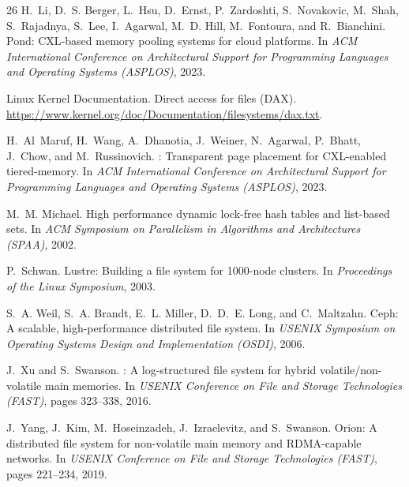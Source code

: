 \documentclass[letterpaper,twocolumn,10pt]{article}
\begin{document}
\begin{thebibliography}{26}
H.~Li, D.~S. Berger, L.~Hsu, D.~Ernst, P.~Zardoshti, S.~Novakovic,
  M.~Shah, S.~Rajadnya, S.~Lee, I.~Agarwal, M.~D. Hill, M.~Fontoura,
  and R.~Bianchini.
\newblock Pond: {CXL}-based memory pooling systems for cloud platforms.
\newblock In {\em ACM International Conference on Architectural Support for
  Programming Languages and Operating Systems (ASPLOS)}, 2023.

{Linux Kernel Documentation}.
\newblock Direct access for files ({DAX}).
\newblock \url{https://www.kernel.org/doc/Documentation/filesystems/dax.txt}.

H.~Al~Maruf, H.~Wang, A.~Dhanotia, J.~Weiner, N.~Agarwal, P.~Bhatt,
  J.~Chow, and M.~Russinovich.
: Transparent page placement for {CXL}-enabled tiered-memory.
\newblock In {\em ACM International Conference on Architectural Support for
  Programming Languages and Operating Systems (ASPLOS)}, 2023.

M.~M. Michael.
\newblock High performance dynamic lock-free hash tables and list-based sets.
\newblock In {\em ACM Symposium on Parallelism in Algorithms and Architectures
  (SPAA)}, 2002.

P.~Schwan.
\newblock Lustre: Building a file system for 1000-node clusters.
\newblock In {\em Proceedings of the Linux Symposium}, 2003.

S.~A. Weil, S.~A. Brandt, E.~L. Miller, D.~D.~E. Long, and C.~Maltzahn.
\newblock Ceph: A scalable, high-performance distributed file system.
\newblock In {\em USENIX Symposium on Operating Systems Design and
  Implementation (OSDI)}, 2006.

J.~Xu and S.~Swanson.
: A log-structured file system for hybrid volatile/non-volatile
  main memories.
\newblock In {\em USENIX Conference on File and Storage Technologies (FAST)},
  pages 323--338, 2016.

J.~Yang, J.~Kim, M.~Hoseinzadeh, J.~Izraelevitz, and S.~Swanson.
\newblock Orion: A distributed file system for non-volatile main memory and
  {RDMA}-capable networks.
\newblock In {\em USENIX Conference on File and Storage Technologies (FAST)},
  pages 221--234, 2019.

\end{thebibliography}

\end{document}
